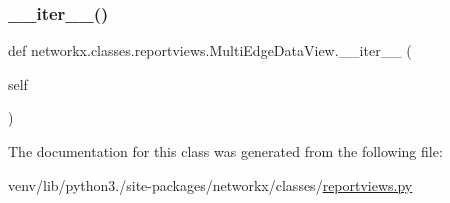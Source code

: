 \mbox{\label{classnetworkx_1_1classes_1_1reportviews_1_1MultiEdgeDataView_a96ccac00e6d408db5689aecc940076a7}} 
\subsubsection{\texorpdfstring{\+\_\+\+\_\+iter\+\_\+\+\_\+()}{\_\_iter\_\_()}}
{\footnotesize\ttfamily def networkx.\+classes.\+reportviews.\+Multi\+Edge\+Data\+View.\+\_\+\+\_\+iter\+\_\+\+\_\+ (\begin{DoxyParamCaption}\item[{}]{self }\end{DoxyParamCaption})}



The documentation for this class was generated from the following file\+:\begin{DoxyCompactItemize}
\item 
venv/lib/python3./site-\/packages/networkx/classes/\hyperlink{reportviews_8py}{reportviews.\+py}\end{DoxyCompactItemize}
